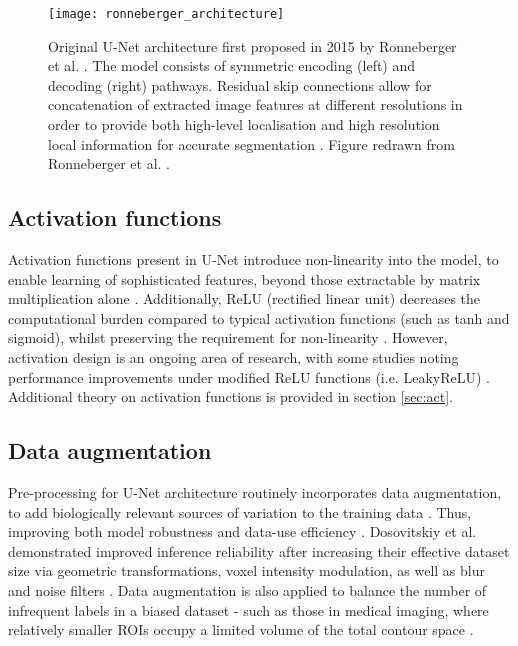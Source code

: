 \begin{figure}[H]
	\begin{center}
		\texttt{[image: ronneberger\_architecture]}
		\caption{Original U-Net architecture first proposed in 2015 by Ronneberger et al. \cite{Ronneberger_2015}. The model consists of symmetric encoding (left) and decoding (right) pathways. Residual skip connections allow for concatenation of extracted image features at different resolutions in order to provide both high-level localisation and high resolution local information for accurate segmentation \cite{Nemoto_2020}. Figure redrawn from Ronneberger et al. \cite{Ronneberger_2015}.}
		\label{fig:unet}
	\end{center}
\end{figure}

\subsection{Activation functions}

Activation functions present in U-Net introduce non-linearity into the model, to enable learning of sophisticated features, beyond those extractable by matrix multiplication alone \cite{Maier2019}. Additionally, ReLU (rectified linear unit) decreases the computational burden compared to typical activation functions (such as tanh and sigmoid), whilst preserving the requirement for non-linearity \cite{Chigozie2018}. However, activation design is an ongoing area of research, with some studies noting performance improvements under modified ReLU functions (i.e. LeakyReLU) \cite{Lin2018}. Additional theory on activation functions is provided in section \ref{sec:act}.

\subsection{Data augmentation}

Pre-processing for U-Net architecture routinely incorporates data augmentation, to add biologically relevant sources of variation to the training data \cite{Maier2019, Hesamian2019, Lundervold2019}. Thus, improving both model robustness and data-use efficiency \cite{Ronneberger_2015}. Dosovitskiy et al. demonstrated improved inference reliability after increasing their effective dataset size via geometric transformations, voxel intensity modulation, as well as blur and noise filters \cite{Dosovitskiy2014}. Data augmentation is also applied to balance the number of infrequent labels in a biased dataset \cite{Maier2019} - such as those in medical imaging, where relatively smaller ROIs occupy a limited volume of the total contour space \cite{Khan2019}. 


